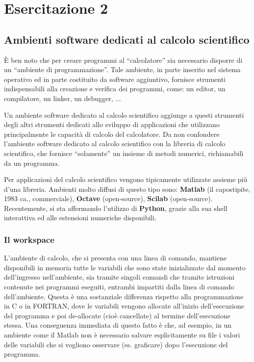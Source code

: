 \section{Esercitazione 2}

\subsection{Ambienti software dedicati al calcolo scientifico}

È ben noto che per creare programmi al ``calcolatore'' sia necessario disporre di un ``ambiente di programmazione''. Tale ambiente, in parte inserito nel sistema operativo ed in parte costituito da software aggiuntivo, fornisce strumenti indispensabili alla creazione e verifica dei programmi, come: un editor, un compilatore, un linker, un debugger, ...     

Un ambiente software dedicato al calcolo scientifico aggiunge a questi strumenti degli altri strumenti dedicati allo sviluppo di applicazioni che utilizzano principalmente le capacità di calcolo del calcolatore.
Da non confondere l'ambiente software dedicato al calcolo scientifico con la libreria di calcolo scientifico, che fornisce ``solamente'' un insieme di metodi numerici, richiamabili da un programma. 

Per applicazioni del calcolo scientifico vengono tipicamente utilizzate assieme più d'una libreria. Ambienti molto diffusi di questo tipo sono: \textbf{Matlab} (il capostipite, 1983 ca., commerciale), \textbf{Octave} (open-source), \textbf{Scilab} (open-source). Recentemente, si sta affermando l'utilizzo di \textbf{Python}, grazie alla sua shell interattiva ed alle estensioni numeriche disponibili.

\subsubsection{Il workspace}

L’ambiente di calcolo, che si presenta con una linea di comando, mantiene disponibili in memoria tutte le variabili che sono state inizializzate dal momento dell'ingresso nell’ambiente, sia tramite singoli comandi che tramite istruzioni contenute nei programmi eseguiti, entrambi impartiti dalla linea di comando dell'ambiente. Questa è una sostanziale differenza rispetto alla programmazione in C o in FORTRAN, dove le variabili vengono allocate all’inizio dell’esecuzione del programma e poi de-allocate (cioè cancellate) al termine dell’esecuzione stessa. Una conseguenza immediata di questo fatto è che, ad esempio, in un ambiente come il Matlab non è necessario salvare esplicitamente su file i valori delle variabili che si vogliono osservare (es. graficare) dopo l’esecuzione del programma.


